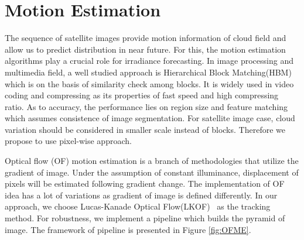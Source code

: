 \documentclass[conference]{IEEEtran}
\begin{document}





\section{Motion Estimation}
\label{sec:motionestimation}
The sequence of satellite images provide motion information of cloud field and
allow us to predict distribution in near future. For this, the motion estimation
algorithms play a crucial role for irradiance forecasting. In image processing
and multimedia field, a well studied approach is Hierarchical Block
Matching(HBM) which is on the basis of similarity check among blocks. It is
widely used in video coding and compressing as its properties of fast speed and
high compressing ratio. As to accuracy, the performance lies on region size and
feature matching which assumes consistence of image segmentation. For
satellite image case, cloud variation should be considered in
smaller scale instead of blocks. Therefore we propose to use pixel-wise
approach.




Optical flow (OF) motion estimation is a branch of methodologies that utilize
the gradient of image. Under the assumption of constant illuminance, displacement of
pixels will be estimated following gradient change. The implementation of OF
idea has a lot of variations as gradient of image is defined differently. In our
approach, we choose Lucas-Kanade Optical Flow(LKOF)~\cite{lucas1981iterative} as
the tracking method. For robustness, we implement a pipeline which
builds the pyramid of image. The framework of pipeline is presented in Figure
\ref{fig:OFME}.
\end{document}
